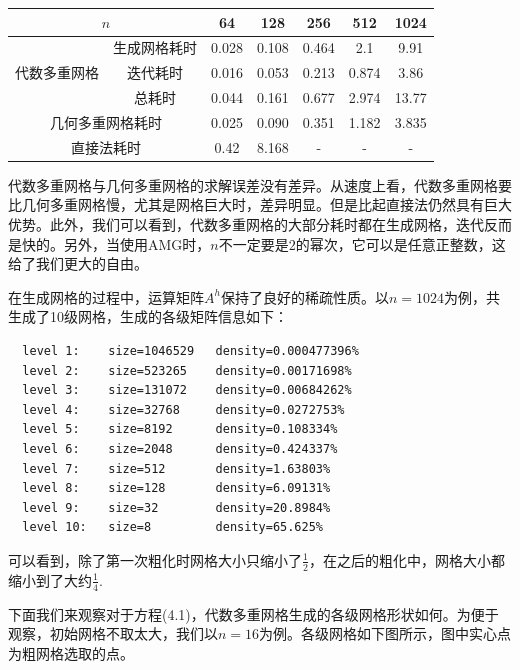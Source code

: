 \documentclass[lang=cn,10pt]{elegantbook}
\begin{document}
\begin{table}[H]
  \centering
  \begin{tabular}{ccccccc}
  \multicolumn{2}{c}{\textbf{$n$}}                                           & 64    & 128   & 256   & 512   & 1024  \\ \hline
  \multicolumn{1}{c|}{\multirow{3}{*}{代数多重网格}} & \multicolumn{1}{c|}{生成网格耗时} & 0.028 & 0.108 & 0.464 & 2.1   & 9.91  \\
  \multicolumn{1}{c|}{}                        & \multicolumn{1}{c|}{迭代耗时}   & 0.016 & 0.053 & 0.213 & 0.874 & 3.86  \\
  \multicolumn{1}{c|}{}                        & \multicolumn{1}{c|}{总耗时}    & 0.044 & 0.161 & 0.677 & 2.974 & 13.77 \\ \cline{1-2}
  \multicolumn{2}{c|}{几何多重网格耗时}                                                & 0.025 & 0.090 & 0.351 & 1.182 & 3.835 \\ \cline{1-2}
  \multicolumn{2}{c|}{直接法耗时}                                                   & 0.42  & 8.168 & -     & -     & -    
  \end{tabular}
\end{table}

代数多重网格与几何多重网格的求解误差没有差异。从速度上看，代数多重网格要比几何多重网格慢，尤其是网格巨大时，差异明显。但是比起直接法仍然具有巨大优势。此外，我们可以看到，代数多重网格的大部分耗时都在生成网格，迭代反而是快的。另外，当使用AMG时，$n$不一定要是$2$的幂次，它可以是任意正整数，这给了我们更大的自由。

在生成网格的过程中，运算矩阵$A^h$保持了良好的稀疏性质。以$n=1024$为例，共生成了10级网格，生成的各级矩阵信息如下：

\begin{lstlisting}
  level 1:    size=1046529   density=0.000477396%
  level 2:    size=523265    density=0.00171698%
  level 3:    size=131072    density=0.00684262%
  level 4:    size=32768     density=0.0272753%
  level 5:    size=8192      density=0.108334%
  level 6:    size=2048      density=0.424337%
  level 7:    size=512       density=1.63803%
  level 8:    size=128       density=6.09131%
  level 9:    size=32        density=20.8984%
  level 10:   size=8         density=65.625%  
\end{lstlisting}

可以看到，除了第一次粗化时网格大小只缩小了$\frac{1}{2}$，在之后的粗化中，网格大小都缩小到了大约$\frac{1}{4}$.

下面我们来观察对于方程(4.1)，代数多重网格生成的各级网格形状如何。为便于观察，初始网格不取太大，我们以$n=16$为例。各级网格如下图所示，图中实心点为粗网格选取的点。
\end{document}
